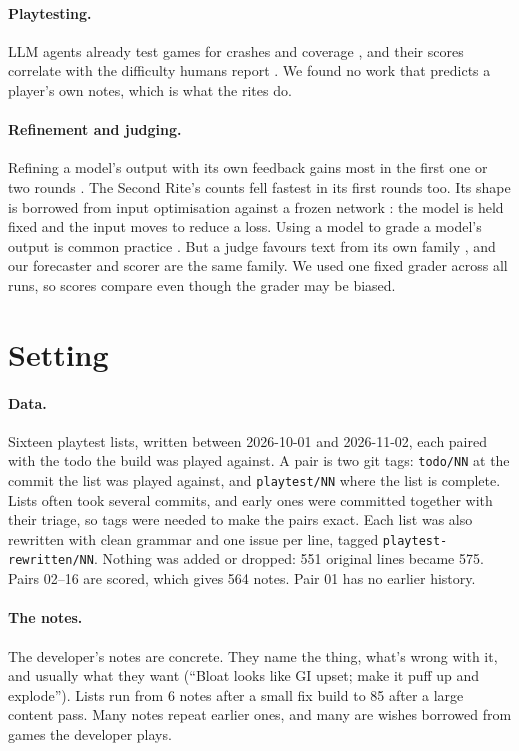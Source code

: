 \documentclass[10pt]{article}
\begin{document}
\paragraph{Playtesting.} LLM agents already test games for crashes and coverage \citep{zhao2025towards, wang2025leveraging}, and their scores correlate with the difficulty humans report \citep{xiao2024llms}. We found no work that predicts a player's own notes, which is what the rites do.

\paragraph{Refinement and judging.} Refining a model's output with its own feedback gains most in the first one or two rounds \citep{madaan2023selfrefine}. The Second Rite's counts fell fastest in its first rounds too. Its shape is borrowed from input optimisation against a frozen network \citep{szegedy2014intriguing}: the model is held fixed and the input moves to reduce a loss. Using a model to grade a model's output is common practice \citep{zheng2023judging}. But a judge favours text from its own family \citep{panickssery2024llm}, and our forecaster and scorer are the same family. We used one fixed grader across all runs, so scores compare even though the grader may be biased.

\section{Setting}
\label{sec:setting}

\paragraph{Data.} Sixteen playtest lists, written between 2026-10-01 and 2026-11-02, each paired with the todo the build was played against. A pair is two git tags: \texttt{todo/NN} at the commit the list was played against, and \texttt{playtest/NN} where the list is complete. Lists often took several commits, and early ones were committed together with their triage, so tags were needed to make the pairs exact. Each list was also rewritten with clean grammar and one issue per line, tagged \texttt{playtest-rewritten/NN}. Nothing was added or dropped: 551 original lines became 575. Pairs 02--16 are scored, which gives 564 notes. Pair 01 has no earlier history.

\paragraph{The notes.} The developer's notes are concrete. They name the thing, what's wrong with it, and usually what they want (``Bloat looks like GI upset; make it puff up and explode''). Lists run from 6 notes after a small fix build to 85 after a large content pass. Many notes repeat earlier ones, and many are wishes borrowed from games the developer plays.
\end{document}
